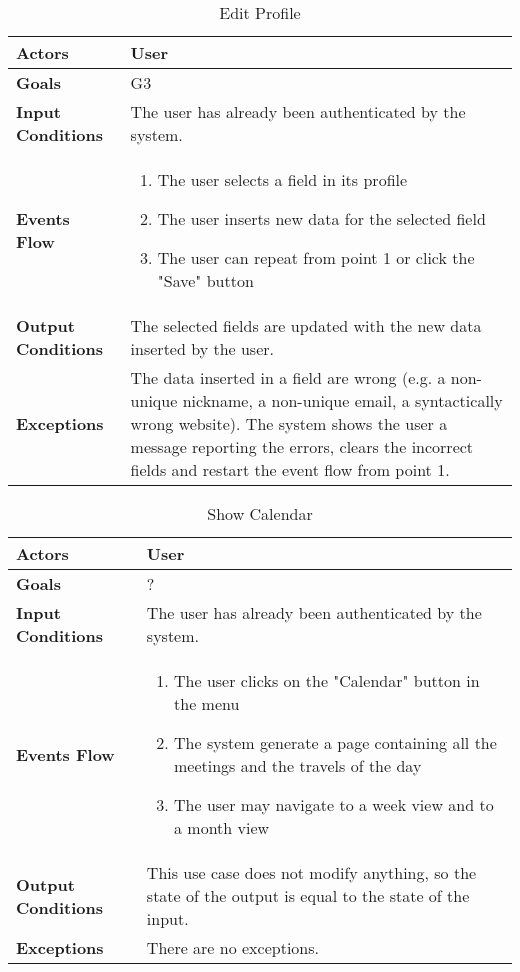 \begin{table}[H]
	\centering
	\def\arraystretch{1.5}
	\begin{tabular}{|p{7cm}|p{7cm}|}
		\hline
		\textbf{Actors}            & User		    \\ \hline
		\textbf{Goals}             & G3           \\ \hline
		\textbf{Input Conditions}  & The user has already been authenticated by the system.           \\ \hline
		\textbf{Events Flow}       & 
			\begin{enumerate}[topsep=0pt, leftmargin=*]
				\item The user selects a field in its profile
				\item The user inserts new data for the selected field
				\item The user can repeat from point 1 or click the "Save" button
			\end{enumerate}           \\ \hline
		\textbf{Output Conditions} & The selected fields are updated with the new data inserted by the user.          \\ \hline
		\textbf{Exceptions}        &  The data inserted in a field are wrong (e.g. a non-unique nickname, a non-unique email, a syntactically wrong website). The system shows the user a message reporting the errors, clears the incorrect fields and restart the event flow from point 1.               \\ \hline
	\end{tabular}
	\caption{Edit Profile}
\end{table}

\begin{table}[H]
	\centering
	\def\arraystretch{1.5}
	\begin{tabular}{|p{7cm}|p{7cm}|}
		\hline
		\textbf{Actors}            & User		    \\ \hline
		\textbf{Goals}             & ?           \\ \hline
		\textbf{Input Conditions}  & The user has already been authenticated by the system.           \\ \hline
		\textbf{Events Flow}       & 
			\begin{enumerate}[topsep=0pt, leftmargin=*]
				\item The user clicks on the "Calendar" button in the menu
				\item The system generate a page containing all the meetings and the travels of the day
				\item The user may navigate to a week view and to a month view
			\end{enumerate}	           \\ \hline
		\textbf{Output Conditions} & This use case does not modify anything, so the state of the output is equal to the state of the input.           \\ \hline
		\textbf{Exceptions}        & There are no exceptions.           \\ \hline
	\end{tabular}
	\caption{Show Calendar}
\end{table}

